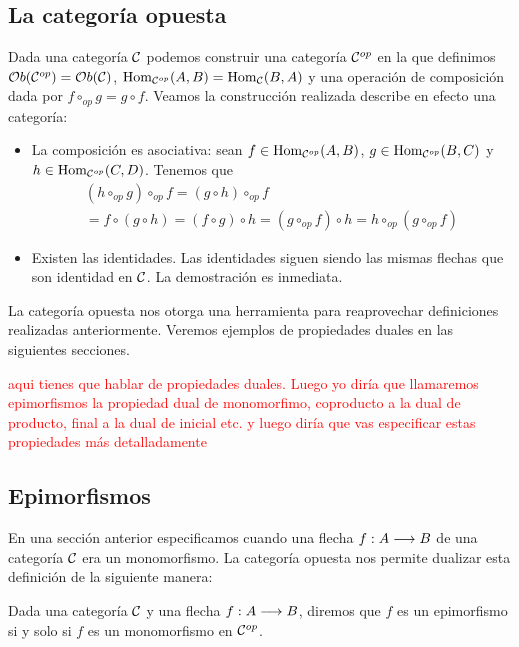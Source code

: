 \subsection{La categoría opuesta}
Dada una categoría $\mathcal{C}$ podemos construir una categoría
$\mathcal{C}^{op}$ en la que definimos $\mathcal{O}b(\mathcal{C}^{op}) = \mathcal{O}b(\mathcal{C})$,
$\operatorname{Hom}_{\mathcal{C}^{op}}(A, B) = \operatorname{Hom}_{\mathcal{C}}(B, A)$ y una operación de
composición dada por $f \circ_{op} g = g \circ f$. Veamos
la construcción realizada describe en efecto una categoría:
\begin{itemize}
\item La composición es asociativa: sean
      $f \in \operatorname{Hom}_{\mathcal{C}^{op}}(A, B)$, $g \in \operatorname{Hom}_{\mathcal{C}^{op}}(B, C)$
      y $h \in \operatorname{Hom}_{\mathcal{C}^{op}}(C, D)$. Tenemos que
\begin{multline*}
(h \circ_{op} g) \circ_{op} f = (g \circ h) \circ_{op} f \\
                              = f \circ (g \circ h)
                              = (f \circ g) \circ h
                              = (g \circ_{op} f)  \circ h
                              = h \circ_{op} (g \circ_{op} f)
\end{multline*}
\item Existen las identidades. Las identidades siguen siendo
      las mismas flechas que son identidad en $\mathcal{C}$. La demostración
      es inmediata.
\end{itemize}

La categoría opuesta nos otorga una herramienta para reaprovechar
definiciones realizadas anteriormente. Veremos ejemplos de propiedades
duales en las siguientes secciones.

\textcolor{red}{aqui tienes que hablar de propiedades duales. Luego yo diría que llamaremos epimorfismos la propiedad dual de monomorfimo, coproducto a la dual de producto, final a la dual de inicial etc.  y luego diría que vas especificar estas propiedades más detalladamente }



\subsection{Epimorfismos}
En una sección anterior especificamos cuando una flecha
$f : A\longrightarrow B$ de una categoría $\mathcal{C}$ era un monomorfismo. La categoría
opuesta nos permite dualizar esta definición de la siguiente manera:

\begin{definition}
Dada una categoría $\mathcal{C}$ y una flecha $f: A\longrightarrow B$, diremos que
$f$ es un epimorfismo si y solo si $f$ es un monomorfismo en
$\mathcal{C}^{op}$.
\end{definition}

